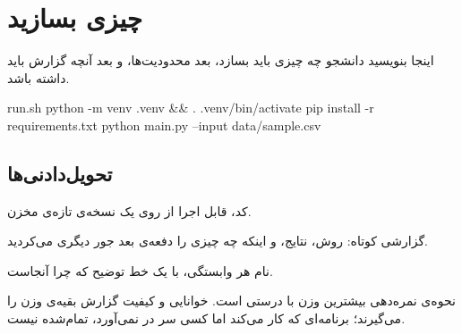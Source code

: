 \section{چیزی بسازید }

اینجا بنویسید دانشجو چه چیزی باید بسازد، بعد محدودیت‌ها، و بعد آنچه گزارش
باید داشته باشد.

\begin{codeblock}{run.sh}
python -m venv .venv && . .venv/bin/activate
pip install -r requirements.txt
python main.py --input data/sample.csv
\end{codeblock}

\subsection{تحویل‌دادنی‌ها}

\begin{checklist}
    \item کد، قابل اجرا از روی یک نسخه‌ی تازه‌ی مخزن.
    \item گزارشی کوتاه: روش، نتایج، و اینکه چه چیزی را دفعه‌ی بعد جور دیگری می‌کردید.
    \item نام هر وابستگی، با یک خط توضیح که چرا آنجاست.
\end{checklist}

\begin{blockbox}{نحوه‌ی نمره‌دهی}
    بیشترین وزن با درستی است. خوانایی و کیفیت گزارش بقیه‌ی وزن را می‌گیرند؛
    برنامه‌ای که کار می‌کند اما کسی سر در نمی‌آورد، تمام‌شده نیست.
\end{blockbox}
